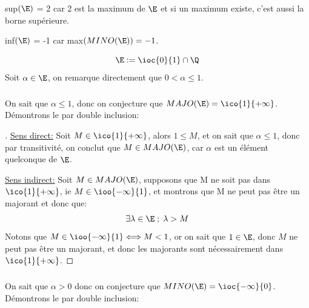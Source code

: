 sup$(\E)$ = 2 car 2 est la maximum de $\E$ et si un maximum existe, c'est aussi la borne supérieure.

inf$(\E)$ = -1 car max$(MINO(\E)) = -1$.\pagebreak


\[
   \E:= \ioc{0}{1} \cap \Q
\]
Soit \(\alpha \in \E\), on remarque directement que \(0 < \alpha \leq 1\).

\subsubsection*{}
On sait que \(\alpha \leq 1\), donc on conjecture que \(MAJO(\E) = \ico{1}{+\infty}\). Démontrons le par double inclusion:
\begin{proof}[\unskip\nopunct]
   \underline{Sens direct:}\+
   Soit \(M \in \ico{1}{+\infty}\), alors \(1 \leq M\), et on sait que \(\alpha \leq 1\), donc par transitivité, on conclut que \(M \in MAJO(\E)\), car \(\alpha\) est un élément quelconque de \(\E\).\<
   
   \underline{Sens indirect:}\+
   Soit \(M \in MAJO(\E)\), supposons que M ne soit pas dans \(\ico{1}{+\infty}\), ie \(M \in \ioo{-\infty}{1}\), et montrons que M ne peut pas être un majorant et donc que:
   \[
      \exists \lambda \in \E \; ; \; \lambda > M    
   \]
   Notons que \(M \in \ioo{-\infty}{1} \Longleftrightarrow M < 1\), or on sait que \(1 \in \E\), donc \(M\) ne peut pas être un majorant, et donc les majorants sont nécessairement dans \(\ico{1}{+\infty}\).
\end{proof}

\subsubsection*{}
On sait que \(\alpha > 0\) donc on conjecture que \(MINO(\E) = \ioc{-\infty}{0}\). Démontrons le par double inclusion:

